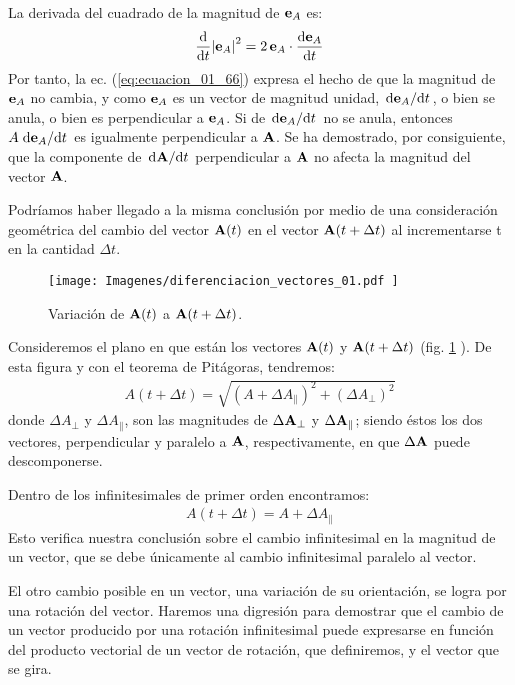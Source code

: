 \documentclass[12pt]{article}
\begin{document}
\par
La derivada del cuadrado de la magnitud de $\vb{e}_{A}$ es:
\begin{align*}
    \dv{t} \abs{\vb{e}_{A}}^{2} = 2 \, \vb{e}_{A} \cdot \dv{\vb{e}_{A}}{t}
\end{align*}
Por tanto, la ec. (\ref{eq:ecuacion_01_66}) expresa el hecho de que la magnitud de $\vb{e}_{A}$ no cambia, y como $\vb{e}_{A}$ es un vector de magnitud unidad, $\dv*{\vb{e}_{A}}{t}$, o bien se anula, o bien es perpendicular a $\vb{e}_{A}$. Si de $\dv*{\vb{e}_{A}}{t}$ no se anula, entonces $A \dv*{\vb{e}_{A}}{t}$ es igualmente perpendicular a $\vb{A}$. Se ha demostrado, por consiguiente, que la componente de $\dv*{\vb{A}}{t}$ perpendicular a $\vb{A}$ no afecta la magnitud del vector $\vb{A}$. 
\par
Podríamos haber llegado a la misma conclusión por medio de una consideración geométrica del cambio del vector $\vb{A} (t)$ en el vector $\vb{A} (t + \Delta t)$ al incrementarse t en la cantidad $\Delta t$. 
\begin{figure}[H]
    \centering
    \texttt{[image: Imagenes/diferenciacion\_vectores\_01.pdf   ]}
    \caption{Variación de $\vb{A} (t)$  a $\vb{A} (t + \Delta t)$.}
    \label{fig:figura_01_19}
\end{figure}
Consideremos el plano en que están los vectores $\vb{A} (t)$ y $\vb{A} (t + \Delta t)$ (fig. \ref{fig:figura_01_19} ). De esta figura y con el teorema de Pitágoras, tendremos:
\begin{align*}
    A (t + \Delta t) = \sqrt{ \left( A + \Delta A_{\parallel} \right)^{2} + \left( \Delta A_{\perp} \right)^{2} }
\end{align*}
donde $\Delta A_{\perp}$ y $\Delta A_{\parallel}$, son las magnitudes de $\Delta \vb{A}_{\perp}$ y $\Delta \vb{A}_{\parallel}$; siendo éstos los dos vectores, perpendicular y paralelo a $\vb{A}$, respectivamente, en que $\Delta \vb{A}$ puede descomponerse. 
\par
Dentro de los infinitesimales de primer orden encontramos:
\begin{align*}
    A \left( t + \Delta t \right) = A + \Delta A_{\parallel}
\end{align*}
Esto verifica nuestra conclusión sobre el cambio infinitesimal en la magnitud de un vector, que se debe únicamente al cambio infinitesimal paralelo al vector. 
\par
El otro cambio posible en un vector, una variación de su orientación, se logra por una rotación del vector. Haremos una digresión para demostrar que el cambio de un vector producido por una rotación infinitesimal puede expresarse en función del producto vectorial de un vector de rotación, que definiremos, y el vector que se gira. 
\end{document}

